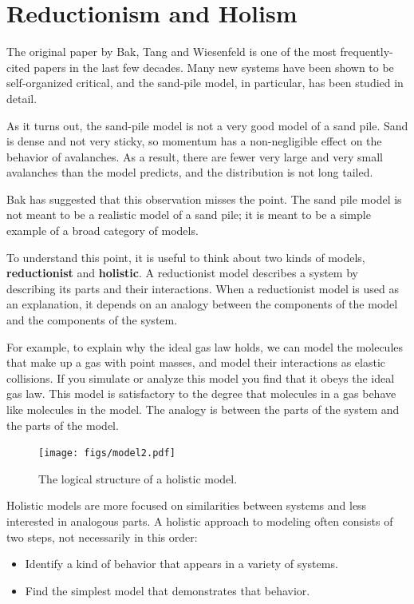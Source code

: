 \documentclass[10pt]{book}
\begin{document}
\section{Reductionism and Holism}

The original paper by Bak, Tang and Wiesenfeld is one of
the most frequently-cited papers in the last few decades.
Many new systems have been shown to be self-organized critical,
and the sand-pile model, in particular, has been studied
in detail.

As it turns out, the sand-pile model is not a very good model
of a sand pile.  Sand is dense and not very sticky, so momentum
has a non-negligible effect on the behavior of avalanches.  As
a result, there are fewer very large and very small avalanches
than the model predicts, and the distribution is not long tailed.

Bak has suggested that this observation misses the point.
The sand pile model is not meant to be a realistic model of a sand
pile; it is meant to be a simple example of a broad category of
models.

To understand this point, it is useful to think about two
kinds of models, {\bf reductionist} and {\bf holistic}.  A
reductionist model describes a system by describing its parts
and their interactions.  When a reductionist model is used
as an explanation, it depends on an analogy between the
components of the model and the components of the system.

For example, to explain why the ideal gas law holds, we can model the
molecules that make up a gas with point masses, and model their
interactions as elastic collisions.  If you simulate or analyze this
model you find that it obeys the ideal gas law.  This model is
satisfactory to the degree that molecules in a gas behave like
molecules in the model.  The analogy is between the parts of the
system and the parts of the model.

\begin{figure}
\centerline{\texttt{[image: figs/model2.pdf]}}
\caption{The logical structure of a holistic model.\label{fig.model2}}
\end{figure}

Holistic models are more focused on similarities between systems and
less interested in analogous parts.  A holistic approach to modeling
often consists of two steps, not necessarily in this order:

\begin{itemize}

\item Identify a kind of behavior that appears in a variety of
systems.

\item Find the simplest model that demonstrates that behavior.

\end{itemize}
\end{document}
